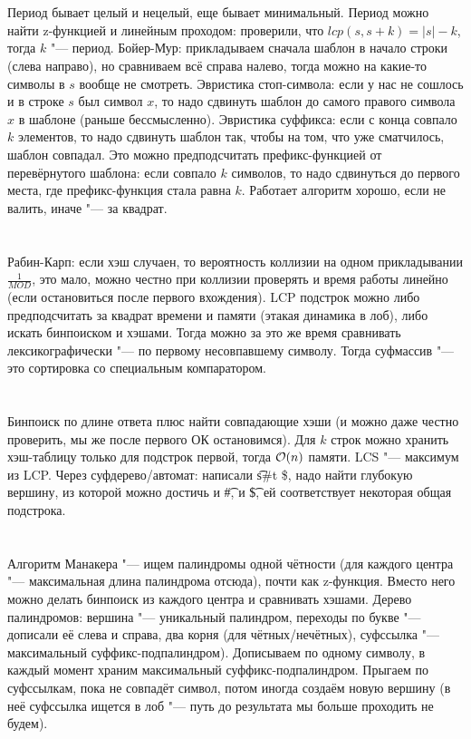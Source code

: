 \section{} %
Период бывает целый и нецелый, еще бывает минимальный.
Период можно найти z-функцией и линейным проходом: проверили, что $lcp(s, s + k) = |s|-k$, тогда $k$ "--- период.
Бойер-Мур: прикладываем сначала шаблон в начало строки (слева направо), но сравниваем всё справа налево, тогда можно на какие-то символы в $s$ вообще не смотреть.
Эвристика стоп-символа: если у нас не сошлось и в строке $s$ был символ $x$, то надо сдвинуть шаблон до самого правого символа $x$ в шаблоне (раньше бессмысленно).
Эвристика суффикса: если с конца совпало $k$ элементов, то надо сдвинуть шаблон так, чтобы на том, что уже сматчилось, шаблон совпадал.
Это можно предподсчитать префикс-функцией от перевёрнутого шаблона: если совпало $k$ символов, то надо сдвинуться до первого места, где префикс-функция стала равна $k$.
Работает алгоритм хорошо, если не валить, иначе "--- за квадрат.

\section{} %
Рабин-Карп: если хэш случаен, то вероятность коллизии на одном прикладывании $\frac{1}{MOD}$, это мало, можно честно при коллизии проверять и время работы линейно (если остановиться после первого вхождения).
LCP подстрок можно либо предподсчитать за квадрат времени и памяти (этакая динамика в лоб), либо искать бинпоиском и хэшами.
Тогда можно за это же время сравнивать лексикографически "--- по первому несовпавшему символу.
Тогда суфмассив "--- это сортировка со специальным компаратором.

\section{} %
Бинпоиск по длине ответа плюс найти совпадающие хэши (и можно даже честно проверить, мы же после первого ОК остановимся).
Для $k$ строк можно хранить хэш-таблицу только для подстрок первой, тогда $\mathcal{O}(n)$ памяти.
LCS "--- максимум из LCP.
Через суфдерево/автомат: написали \t{s\#t \$}, надо найти глубокую вершину, из которой можно достичь и \t{\#}, и \t{\$}, ей соответствует некоторая общая подстрока.

\section{} %
Алгоритм Манакера "--- ищем палиндромы одной чётности (для каждого центра "--- максимальная длина палиндрома отсюда), почти как z-функция.
Вместо него можно делать бинпоиск из каждого центра и сравнивать хэшами.
Дерево палиндромов: вершина "--- уникальный палиндром, переходы по букве "--- дописали её слева и справа, два корня (для чётных/нечётных),
суфссылка "--- максимальный суффикс-подпалиндром).
Дописываем по одному символу, в каждый момент храним максимальный суффикс-подпалиндром.
Прыгаем по суфссылкам, пока не совпадёт символ, потом иногда создаём новую вершину (в неё суфссылка ищется в лоб "--- путь до результата мы больше проходить не будем).


